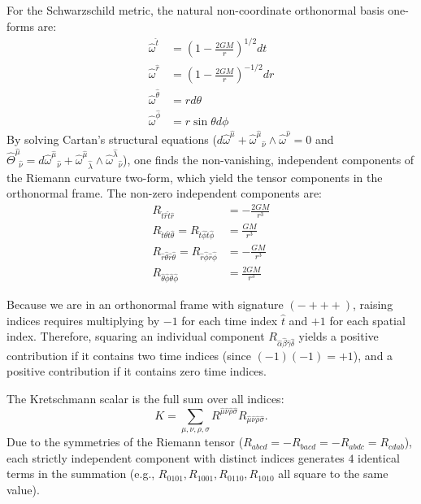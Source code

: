 \documentclass[11pt, a4paper]{report}
\begin{document}
For the Schwarzschild metric, the natural non-coordinate orthonormal basis one-forms are:
\begin{align}
\hat{\omega}^{\hat{t}} &= \left(1-\frac{2GM}{r}\right)^{1/2} dt \\
\hat{\omega}^{\hat{r}} &= \left(1-\frac{2GM}{r}\right)^{-1/2} dr \\
\hat{\omega}^{\hat{\theta}} &= r d\theta \\
\hat{\omega}^{\hat{\phi}} &= r \sin\theta d\phi
\end{align}
By solving Cartan's structural equations ($d\hat{\omega}^{\hat{\mu}} + {\hat{\omega}^{\hat{\mu}}}_{\hat{\nu}} \wedge \hat{\omega}^{\hat{\nu}} = 0$ and $\hat{\Theta}^{\hat{\mu}}_{\ \ \hat{\nu}} = d{\hat{\omega}^{\hat{\mu}}}_{\hat{\nu}} + {\hat{\omega}^{\hat{\mu}}}_{\hat{\lambda}} \wedge {\hat{\omega}^{\hat{\lambda}}}_{\hat{\nu}}$), one finds the non-vanishing, independent components of the Riemann curvature two-form, which yield the tensor components in the orthonormal frame. The non-zero independent components are:
\begin{align}
R_{\hat{t}\hat{r}\hat{t}\hat{r}} &= -\frac{2GM}{r^{3}} \\
R_{\hat{t}\hat{\theta}\hat{t}\hat{\theta}} = R_{\hat{t}\hat{\phi}\hat{t}\hat{\phi}} &= \frac{GM}{r^{3}} \\
R_{\hat{r}\hat{\theta}\hat{r}\hat{\theta}} = R_{\hat{r}\hat{\phi}\hat{r}\hat{\phi}} &= -\frac{GM}{r^{3}} \\
R_{\hat{\theta}\hat{\phi}\hat{\theta}\hat{\phi}} &= \frac{2GM}{r^{3}}
\end{align}

Because we are in an orthonormal frame with signature $(-+++)$, raising indices requires multiplying by $-1$ for each time index $\hat{t}$ and $+1$ for each spatial index. Therefore, squaring an individual component $R_{\hat{\alpha}\hat{\beta}\hat{\gamma}\hat{\delta}}$ yields a positive contribution if it contains two time indices (since $(-1)(-1) = +1$), and a positive contribution if it contains zero time indices. 

The Kretschmann scalar is the full sum over all indices:
\begin{equation}
K = \sum_{\mu,\nu,\rho,\sigma} R^{\hat{\mu}\hat{\nu}\hat{\rho}\hat{\sigma}}R_{\hat{\mu}\hat{\nu}\hat{\rho}\hat{\sigma}}.
\end{equation}
Due to the symmetries of the Riemann tensor ($R_{abcd} = -R_{bacd} = -R_{abdc} = R_{cdab}$), each strictly independent component with distinct indices generates $4$ identical terms in the summation (e.g., $R_{0101}, R_{1001}, R_{0110}, R_{1010}$ all square to the same value). 
\end{document}
